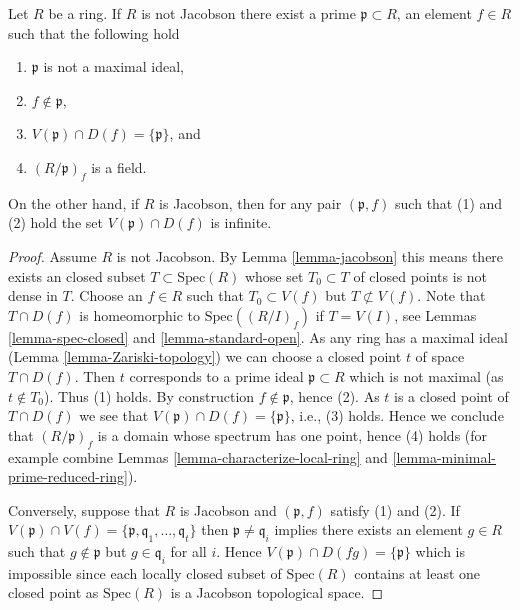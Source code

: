 \begin{lemma}
\label{lemma-characterize-jacobson}
Let $R$ be a ring. If $R$ is not Jacobson there exist
a prime $\mathfrak p \subset R$, an element $f \in R$
such that the following hold
\begin{enumerate}
\item $\mathfrak p$ is not a maximal ideal,
\item $f \not \in \mathfrak p$,
\item $V(\mathfrak p) \cap D(f) = \{\mathfrak p\}$, and
\item $(R/\mathfrak p)_f$ is a field.
\end{enumerate}
On the other hand, if $R$ is Jacobson, then for any pair $(\mathfrak p, f)$
such that (1) and (2) hold the set $V(\mathfrak p) \cap D(f)$ is
infinite.
\end{lemma}

\begin{proof}
Assume $R$ is not Jacobson.
By Lemma \ref{lemma-jacobson} this means there exists an
closed subset $T \subset \text{Spec}(R)$
whose set $T_0 \subset T$ of closed points is not dense in $T$.
Choose an $f \in R$ such that $T_0 \subset V(f)$ but
$T \not \subset V(f)$. Note that $T \cap D(f)$
is homeomorphic to $\text{Spec}((R/I)_f)$ if $T = V(I)$, see
Lemmas \ref{lemma-spec-closed} and \ref{lemma-standard-open}.
As any ring has a maximal ideal
(Lemma \ref{lemma-Zariski-topology}) we can choose a closed point $t$ of
space $T \cap D(f)$. Then $t$ corresponds to a prime ideal
$\mathfrak p \subset R$ which is not maximal (as $t \not \in T_0$).
Thus (1) holds. By construction $f \not \in \mathfrak p$, hence (2).
As $t$ is a closed point of $T \cap D(f)$ we see that
$V(\mathfrak p) \cap D(f) = \{\mathfrak p\}$, i.e., (3) holds. Hence we
conclude that $(R/\mathfrak p)_f$ is a domain whose
spectrum has one point, hence (4) holds
(for example combine Lemmas \ref{lemma-characterize-local-ring} and
\ref{lemma-minimal-prime-reduced-ring}).

\medskip\noindent
Conversely, suppose that $R$ is Jacobson and $(\mathfrak p, f)$
satisfy (1) and (2). If
$V(\mathfrak p) \cap V(f) =
\{\mathfrak p, \mathfrak q_1, \ldots, \mathfrak q_t\}$
then $\mathfrak p \not = \mathfrak q_i$
implies there exists an element $g \in R$ such that $g \not \in \mathfrak p$
but $g \in \mathfrak q_i$ for all $i$. Hence
$V(\mathfrak p) \cap D(fg) = \{\mathfrak p\}$ which
is impossible since each locally closed subset of $\text{Spec}(R)$
contains at least one closed point as $\text{Spec}(R)$ is
a Jacobson topological space.
\end{proof}

